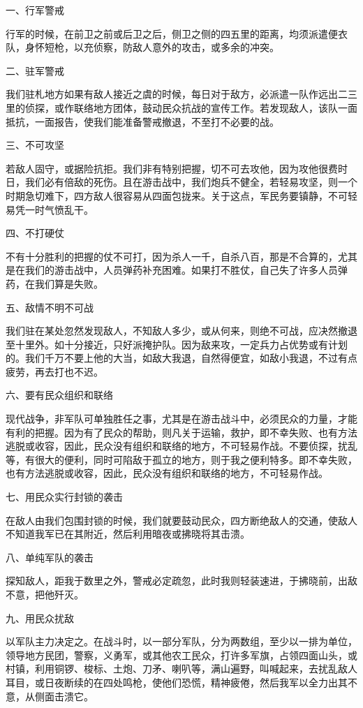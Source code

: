 一、行军警戒

行军的时候，在前卫之前或后卫之后，侧卫之侧的四五里的距离，均须派遣便衣队，身怀短枪，以充侦察，防敌人意外的攻击，或多余的冲突。

二、驻军警戒

我们驻札地方如果有敌人接近之虞的时候，每日对于敌方，必派遣一队作远出二三里的侦探，或作联络地方团体，鼓动民众抗战的宣传工作。若发现敌人，该队一面抵抗，一面报告，使我们能准备警戒撤退，不至打不必要的战。

三、不可攻坚

若敌人固守，或据险抗拒。我们非有特别把握，切不可去攻他，因为攻他很费时日，我们必有倍敌的死伤。且在游击战中，我们炮兵不健全，若轻易攻坚，则一个时期急切难下，四方敌人很容易从四面包拢来。关于这点，军民务要镇静，不可轻易凭一时气愤乱干。

四、不打硬仗

不有十分胜利的把握的仗不可打，因为杀人一千，自杀八百，那是不合算的，尤其是在我们的游击战中，人员弹药补充困难。如果打不胜仗，自己失了许多人员弹药，在我们算是失败。

五、敌情不明不可战

我们驻在某处忽然发现敌人，不知敌人多少，或从何来，则绝不可战，应决然撤退至十里外。如十分接近，只好派掩护队。因为敌来攻，一定兵力占优势或有计划的。我们千万不要上他的大当，如敌大我退，自然得便宜，如敌小我退，不过有点疲劳，再去打也不迟。

六、要有民众组织和联络

现代战争，非军队可单独胜任之事，尤其是在游击战斗中，必须民众的力量，才能有利的把握。因为有了民众的帮助，则凡关于运输，救护，即不幸失败、也有方法逃脱或收容，因此，民众没有组织和联络的地方，不可轻易作战。不要侦探，扰乱等，有很大的便利，同时可陷敌于孤立的地方，则于我之便利特多。即不幸失败，也有方法逃脱或收容，因此，民众没有组织和联络的地方，不可轻易作战。

七、用民众实行封锁的袭击

在敌人由我们包围封锁的时候，我们就要鼓动民众，四方断绝敌人的交通，使敌人不知道我军已在其附近，然后利用暗夜或拂晓将其击溃。

八、单纯军队的袭击

探知敌人，距我于数里之外，警戒必定疏忽，此时我则轻装速进，于拂晓前，出敌不意，把他歼灭。

九、用民众扰敌

以军队主力决定之。在战斗时，以一部分军队，分为两数组，至少以一排为单位，领导地方民团，警察，义勇军，或其他农工民众，打许多军旗，占领四面山头，或村镇，利用铜锣、梭标、土炮、刀矛、喇叭等，满山遍野，叫喊起来，去扰乱敌人耳目，或日夜断续的在四处鸣枪，使他们恐慌，精神疲倦，然后我军以全力出其不意，从侧面击溃它。

